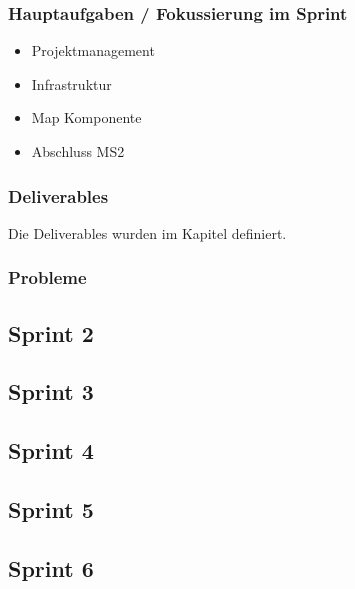 \subsubsection{Hauptaufgaben / Fokussierung im Sprint}
\begin{itemize}
	\item Projektmanagement
	\item Infrastruktur
	\item Map Komponente
	\item Abschluss MS2
\end{itemize}

\subsubsection{Deliverables}
Die Deliverables wurden im Kapitel  definiert.

\subsubsection{Probleme}


\subsection{Sprint 2}


\subsection{Sprint 3}


\subsection{Sprint 4}


\subsection{Sprint 5}


\subsection{Sprint 6}